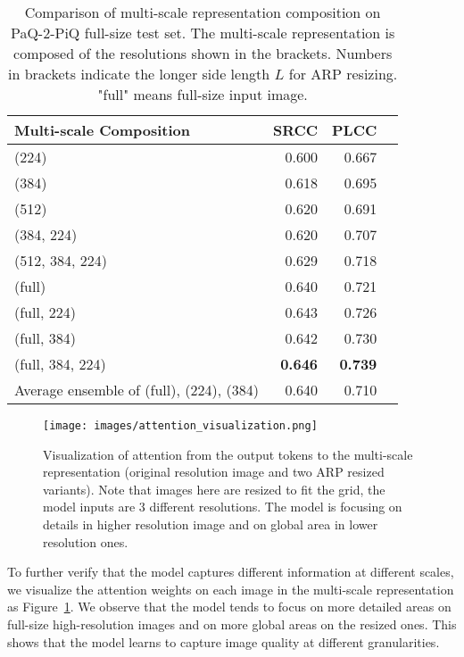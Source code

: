\begin{table}[!tp]
\footnotesize
\begin{center}
\begin{tabular}{lrrr}\toprule
Multi-scale Composition &SRCC &PLCC \\\midrule
(224) &0.600 &0.667 \\
(384) &0.618 &0.695 \\
(512) &0.620 &0.691 \\
(384, 224) &0.620 &0.707 \\
(512, 384, 224) &0.629 &0.718 \\\midrule
(full) &0.640 &0.721 \\
(full, 224) &0.643 &0.726 \\
(full, 384) &0.642 &0.730 \\
(full, 384, 224) &\textbf{0.646} &\textbf{0.739} \\\midrule
Average ensemble of (full), (224), (384) &0.640 &0.710 \\
\bottomrule
\end{tabular}
\end{center}
\vspace{-2mm}
\caption{Comparison of multi-scale representation composition on PaQ-2-PiQ full-size test set. The multi-scale representation is composed of the resolutions shown in the brackets. Numbers in brackets indicate the longer side length $L$ for ARP resizing. "full" means full-size input image.  }\label{tab:multi-scale-composition}
\vspace{-3mm}
\end{table}

\begin{figure}[!tp]
\centering
\texttt{[image: images/attention\_visualization.png]}
\caption{Visualization of attention from the output tokens to the multi-scale representation (original resolution image and two ARP resized variants). Note that images here are resized to fit the grid, the model inputs are 3 different resolutions. The model is focusing on details in higher resolution image and on global area in lower resolution ones.}\vspace{-2mm}
\label{fig:attention_visualization} 
\end{figure}

To further verify that the model captures different information at different scales, we visualize the attention weights on each image in the multi-scale representation as Figure~\ref{fig:attention_visualization}. We observe that the model tends to focus on more detailed areas on full-size high-resolution images and on more global areas on the resized ones. This shows that the model learns to capture image quality at different granularities.


